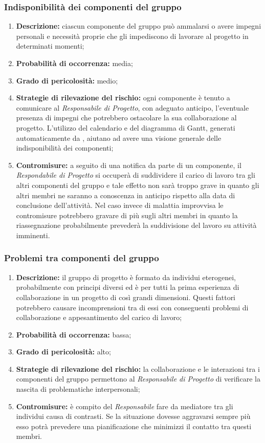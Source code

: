 \subsubsection{Indisponibilità dei componenti del gruppo}
\begin{enumerate}
\item \textbf{Descrizione:} ciascun componente del gruppo può ammalarsi o avere impegni personali e necessità proprie che gli impediscono di lavorare al progetto in determinati momenti;
\item \textbf{Probabilità di occorrenza:} media;
\item \textbf{Grado di pericolosità:} medio;
\item \textbf{Strategie di rilevazione del rischio:} ogni componente è tenuto a comunicare al \textit{Responsabile di Progetto}, con adeguato anticipo, l'eventuale presenza di impegni che potrebbero ostacolare la sua collaborazione al progetto. L'utilizzo del calendario e del diagramma di Gantt, generati automaticamente da , aiutano ad avere una visione generale delle indisponibilità dei componenti; 
\item \textbf{Contromisure:} a seguito di una notifica da parte di un componente, il \textit{Respondabile di Progetto} si occuperà di suddividere il carico di lavoro tra gli altri componenti del gruppo e tale effetto non sarà troppo grave in quanto gli altri membri ne saranno a conoscenza in anticipo rispetto alla data di conclusione dell'attività. Nel caso invece di malattia improvvisa le contromisure potrebbero gravare di più sugli altri membri in quanto la riassegnazione probabilmente prevederà la suddivisione del lavoro su attività imminenti.
\end{enumerate}

\subsubsection{Problemi tra componenti del gruppo}
\begin{enumerate}
\item \textbf{Descrizione:} il gruppo di progetto è formato da individui eterogenei, probabilmente con principi diversi ed è per tutti la prima esperienza di collaborazione in un progetto di così grandi dimensioni. Questi fattori potrebbero causare incomprensioni tra di essi con conseguenti problemi di collaborazione e appesantimento del carico di lavoro;
\item \textbf{Probabilità di occorrenza:} bassa;
\item \textbf{Grado di pericolosità:} alto;
\item \textbf{Strategie di rilevazione del rischio:} la collaborazione e le interazioni tra i componenti del gruppo permettono al \textit{Responsabile di Progetto} di verificare la nascita di problematiche interpersonali;
\item \textbf{Contromisure:} è compito del \textit{Responsabile} fare da mediatore tra gli individui causa di contrasti. Se la situazione dovesse aggravarsi sempre più esso potrà prevedere una pianificazione che minimizzi il contatto tra questi membri.
\end{enumerate}

